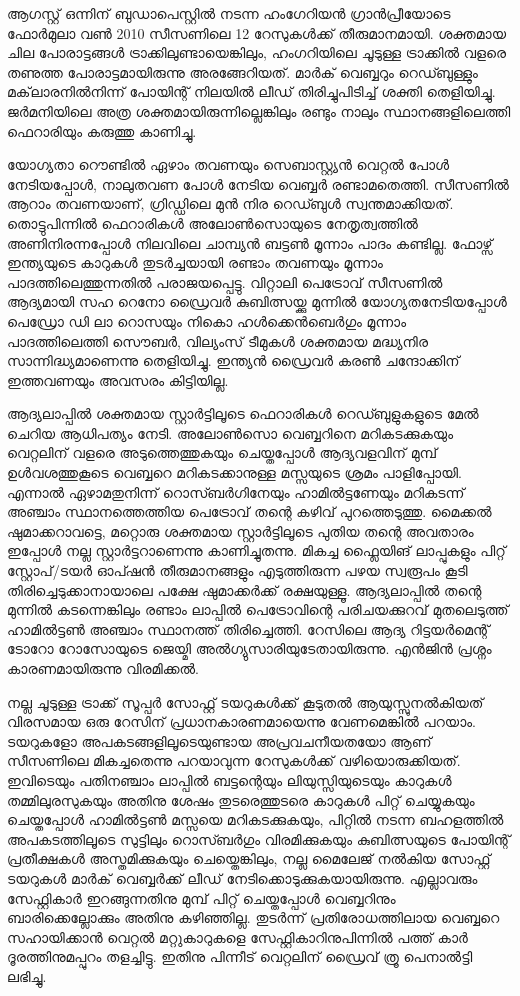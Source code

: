 \vskip 2pt

ആഗസ്റ്റ് ഒന്നിന് ബുഡാപെസ്റ്റില്‍ നടന്ന ഹംഗേറിയന്‍ ഗ്രാന്‍പ്രീയോടെ ഫോര്‍മുലാ വണ്‍ 2010 സീസണിലെ 12 റേസുകള്‍ക്ക് തീരുമാനമായി. ശക്തമായ ചില പോരാട്ടങ്ങള്‍ ട്രാക്കിലുണ്ടായെങ്കിലും, ഹംഗറിയിലെ ചൂടുള്ള ട്രാക്കില്‍ വളരെ തണുത്ത പോരാട്ടമായിരുന്നു അരങ്ങേറിയത്. മാര്‍ക് വെബ്ബറും റെഡ്ബുള്ളും മക്‌ലാരനില്‍നിന്ന് പോയിന്റ് നിലയില്‍ ലീഡ് തിരിച്ചുപിടിച്ച് ശക്തി തെളിയിച്ചു. ജര്‍മനിയിലെ അത്ര ശക്തമായിരുന്നില്ലെങ്കിലും രണ്ടും നാലും സ്ഥാനങ്ങളിലെത്തി ഫെറാരിയും കരുത്തു കാണിച്ചു.

യോഗ്യതാ റൌണ്ടില്‍ ഏഴാം തവണയും സെബാസ്റ്റ്യന്‍ വെറ്റല്‍ പോള്‍ നേടിയപ്പോള്‍, നാലുതവണ പോള്‍ നേടിയ 
വെബ്ബര്‍ രണ്ടാമതെത്തി. സീസണില്‍ ആറാം തവണയാണ്, ഗ്രിഡ്ഡിലെ മുന്‍ നിര റെഡ്ബുള്‍ സ്വന്തമാക്കിയത്. 
തൊട്ടുപിന്നില്‍ ഫെറാരികള്‍ അലോണ്‍സൊയുടെ നേതൃത്വത്തില്‍ അണിനിരന്നപ്പോള്‍ നിലവിലെ ചാമ്പ്യന്‍ ബട്ടണ്‍ 
മൂന്നാം പാദം കണ്ടില്ല. ഫോഴ്സ് ഇന്ത്യയുടെ കാറുകള്‍ തുടര്‍ച്ചയായി രണ്ടാം തവണയും മൂന്നാം പാദത്തിലെത്തുന്നതില്‍ 
പരാജയപ്പെട്ടു. വിറ്റാലി പെട്രോവ് സീസണില്‍ ആദ്യമായി സഹ റെനോ ഡ്രൈവര്‍ കുബിത്സയ്ക്കു മുന്നില്‍ 
യോഗ്യതനേടിയപ്പോള്‍ പെഡ്രോ ഡി ലാ റൊസയും നികൊ ഹള്‍ക്കെന്‍ബെര്‍ഗും മൂന്നാം പാദത്തിലെത്തി സൌബര്‍, 
വില്യംസ് ടീമുകള്‍ ശക്തമായ മദ്ധ്യനിര സാന്നിദ്ധ്യമാണെന്നു തെളിയിച്ചു. ഇന്ത്യന്‍ ഡ്രൈവര്‍ കരണ്‍ ചന്ദോക്കിന് 
ഇത്തവണയും അവസരം കിട്ടിയില്ല.

ആദ്യലാപ്പില്‍ ശക്തമായ സ്റ്റാര്‍ട്ടിലൂടെ ഫെറാരികള്‍ റെഡ്ബുളുകളുടെ മേല്‍ ചെറിയ ആധിപത്യം നേടി. അലോണ്‍സൊ 
വെബ്ബറിനെ മറികടക്കുകയും വെറ്റലിന് വളരെ അടുത്തെത്തുകയും ചെയ്തപ്പോള്‍ ആദ്യവളവിന് മുമ്പ് ഉള്‍വശത്തുകൂടെ 
വെബ്ബറെ മറികടക്കാനുള്ള മസ്സയുടെ ശ്രമം പാളിപ്പോയി. എന്നാല്‍ ഏഴാമതുനിന്ന് റൊസ്ബര്‍ഗിനേയും ഹാമില്‍ട്ടണേയും
മറികടന്ന് അഞ്ചാം സ്ഥാനത്തെത്തിയ പെട്രോവ് തന്റെ കഴിവ് പുറത്തെടുത്തു. മൈക്കല്‍ ഷുമാക്കറാവട്ടെ, മറ്റൊരു 
ശക്തമായ സ്റ്റാര്‍ട്ടിലൂടെ പുതിയ തന്റെ അവതാരം ഇപ്പോള്‍ നല്ല സ്റ്റാര്‍ട്ടറാണെന്നു കാണിച്ചുതന്നു. മികച്ച ഫ്ലൈയിങ് 
ലാപ്പുകളും പിറ്റ് സ്റ്റോപ്/ടയര്‍ ഓപ്ഷന്‍ തീരുമാനങ്ങളും എടുത്തിരുന്ന പഴയ സ്വരൂപം കൂടി തിരിച്ചെടുക്കാനായാലെ പക്ഷേ 
ഷുമാക്കര്‍ക്ക് രക്ഷയുള്ളൂ. ആദ്യലാപ്പില്‍ തന്റെ മുന്നില്‍ കടന്നെങ്കിലും രണ്ടാം ലാപ്പില്‍ പെട്രോവിന്റെ പരിചയക്കുറവ് 
മുതലെടുത്ത് ഹാമില്‍ട്ടണ്‍ അഞ്ചാം സ്ഥാനത്ത് തിരിച്ചെത്തി. റേസിലെ ആദ്യ റിട്ടയര്‍മെന്റ് ടോറോ റോസോയുടെ 
ജെയ്മി അല്‍ഗ്യുസാരിയുടേതായിരുന്നു. എന്‍ജിന്‍ പ്രശ്നം കാരണമായിരുന്നു വിരമിക്കല്‍.

നല്ല ചൂടുള്ള ട്രാക്ക് സൂപ്പര്‍ സോഫ്റ്റ് ടയറുകള്‍ക്ക് കൂടുതല്‍ ആയുസ്സുനല്‍കിയത് വിരസമായ ഒരു റേസിന് 
പ്രധാനകാരണമായെന്നു വേണമെങ്കില്‍ പറയാം. ടയറുകളോ അപകടങ്ങളിലൂടെയുണ്ടായ അപ്രവചനീയതയോ ആണ് 
സീസണിലെ മികച്ചതെന്നു പറയാവുന്ന റേസുകള്‍ക്ക് വഴിയൊരുക്കിയത്. ഇവിടെയും പതിനഞ്ചാം ലാപ്പില്‍ ബട്ടന്റെയും 
ലിയുസ്സിയുടെയും കാറുകള്‍ തമ്മിലുരസുകയും അതിനു ശേഷം തുടരെത്തുടരെ കാറുകള്‍ പിറ്റ് ചെയ്യുകയും ചെയ്തപ്പോള്‍ 
ഹാമില്‍ട്ടണ്‍ മസ്സയെ മറികടക്കുകയും, പിറ്റില്‍ നടന്ന ബഹളത്തില്‍ അപകടത്തിലൂടെ സുട്ടിലും റൊസ്ബര്‍ഗും 
വിരമിക്കുകയും കുബിത്സയുടെ പോയിന്റ് പ്രതീക്ഷകള്‍ അസ്തമിക്കുകയും ചെയ്തെങ്കിലും, നല്ല മൈലേജ് നല്‍കിയ സോഫ്റ്റ് 
ടയറുകള്‍ മാര്‍ക് വെബ്ബര്‍ക്ക് ലീഡ് നേടിക്കൊടുക്കുകയായിരുന്നു. എല്ലാവരും സേഫ്റ്റികാര്‍ ഇറങ്ങുന്നതിനു മുമ്പ് പിറ്റ് 
ചെയ്തപ്പോള്‍ വെബ്ബറിനും ബാരിക്കെല്ലോക്കും അതിനു കഴിഞ്ഞില്ല. തുടര്‍ന്ന് പ്രതിരോധത്തിലായ വെബ്ബറെ സഹായിക്കാന്‍ 
വെറ്റല്‍ മറ്റുകാറുകളെ സേഫ്റ്റികാറിനുപിന്നില്‍ പത്ത് കാര്‍ ദൂരത്തിനുമപ്പുറം തളച്ചിട്ടു. ഇതിനു പിന്നീട് വെറ്റലിന് ഡ്രൈവ് 
ത്രൂ പെനാല്‍ട്ടി ലഭിച്ചു.

